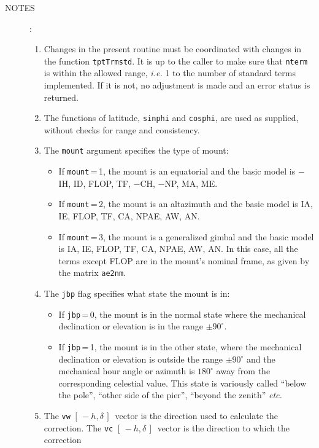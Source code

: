 \documentclass[12pt,fleqn,twoside]{article}
\renewcommand{\_}{{\tt\char'137}}     %
\newcommand{\mhadec}     {$[\,-h,\delta\,]$}
\newcommand{\notes}[1]
{
  \goodbreak
  \begin{description}
    \item[NOTES]: \nopagebreak
        #1
  \end{description}
  \vspace{-3ex}
}
\begin{document}
\notes{
\begin{enumerate}
\setlength{\parskip}{\medskipamount}
\item Changes in the present routine must be coordinated with changes
      in the function {\tt tptTrmstd}.
      It is up to the caller to make sure that {\tt nterm} is within the
      allowed range, {\it i.e.}\/ 1 to the number of standard terms
      implemented.  If it is not, no adjustment is made and an error
      status is returned.
\item The functions of latitude, {\tt sinphi} and {\tt cosphi}, are used as
      supplied, without checks for range and consistency.
\item The {\tt mount} argument specifies the type of mount:
      \begin{itemize}
      \item If {\tt mount}\,=\,1, the mount is an equatorial and the
            basic model is $-$IH, ID, FLOP, TF, $-$CH, $-$NP, MA, ME.
      \item If {\tt mount}\,=\,2, the mount is an altazimuth and the
            basic model is IA, IE, FLOP, TF, CA, NPAE, AW, AN.
      \item If {\tt mount}\,=\,3, the mount is a generalized gimbal
            and the basic model is
            IA, IE, FLOP, TF, CA, NPAE, AW, AN.  In this case, all
            the terms except FLOP are in the mount's nominal frame,
            as given by the matrix {\tt ae2nm}.
      \end{itemize}
\item The {\tt jbp} flag specifies what state the mount is in:
      \begin{itemize}
      \item If {\tt jbp}\,=\,0, the mount is in the normal state
            where the mechanical declination or elevation is in the
            range $\pm90^\circ$.
      \item If {\tt jbp}\,=\,1, the mount is in the other state,
            where the mechanical
            declination or elevation is outside the range $\pm90^\circ$
            and the mechanical hour angle or azimuth is $180^\circ$
            away from the corresponding celestial value.  This state is
            variously called ``below the pole'', ``other side of the pier'',
            ``beyond the zenith'' {\it etc.}
      \end{itemize}
\item The {\tt vw} \mhadec\ vector is the direction used to calculate the
      correction.
      The {\tt vc} \mhadec\ vector is the direction to which the correction

\end{enumerate}}
\end{document}
